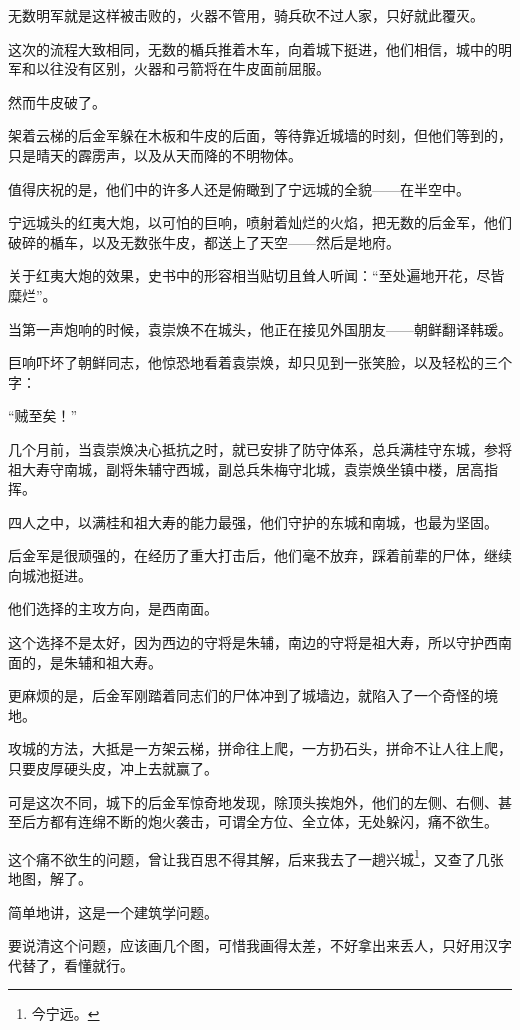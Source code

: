 \begin{multicols}{\theparacolNo}
		无数明军就是这样被击败的，火器不管用，骑兵砍不过人家，只好就此覆灭。

		这次的流程大致相同，无数的楯兵推着木车，向着城下挺进，他们相信，城中的明军和以往没有区别，火器和弓箭将在牛皮面前屈服。

		然而牛皮破了。

		架着云梯的后金军躲在木板和牛皮的后面，等待靠近城墙的时刻，但他们等到的，只是晴天的霹雳声，以及从天而降的不明物体。

		值得庆祝的是，他们中的许多人还是俯瞰到了宁远城的全貌——在半空中。

		宁远城头的红夷大炮，以可怕的巨响，喷射着灿烂的火焰，把无数的后金军，他们破碎的楯车，以及无数张牛皮，都送上了天空——然后是地府。

		关于红夷大炮的效果，史书中的形容相当贴切且耸人听闻：“至处遍地开花，尽皆糜烂”。

		当第一声炮响的时候，袁崇焕不在城头，他正在接见外国朋友——朝鲜翻译韩瑗。

		巨响吓坏了朝鲜同志，他惊恐地看着袁崇焕，却只见到一张笑脸，以及轻松的三个字：

		“贼至矣！”

		几个月前，当袁崇焕决心抵抗之时，就已安排了防守体系，总兵满桂守东城，参将祖大寿守南城，副将朱辅守西城，副总兵朱梅守北城，袁崇焕坐镇中楼，居高指挥。

		四人之中，以满桂和祖大寿的能力最强，他们守护的东城和南城，也最为坚固。

		后金军是很顽强的，在经历了重大打击后，他们毫不放弃，踩着前辈的尸体，继续向城池挺进。

		他们选择的主攻方向，是西南面。

		这个选择不是太好，因为西边的守将是朱辅，南边的守将是祖大寿，所以守护西南面的，是朱辅和祖大寿。

		更麻烦的是，后金军刚踏着同志们的尸体冲到了城墙边，就陷入了一个奇怪的境地。

		攻城的方法，大抵是一方架云梯，拼命往上爬，一方扔石头，拼命不让人往上爬，只要皮厚硬头皮，冲上去就赢了。

		可是这次不同，城下的后金军惊奇地发现，除顶头挨炮外，他们的左侧、右侧、甚至后方都有连绵不断的炮火袭击，可谓全方位、全立体，无处躲闪，痛不欲生。

		这个痛不欲生的问题，曾让我百思不得其解，后来我去了一趟兴城\footnote{今宁远。}，又查了几张地图，解了。

		简单地讲，这是一个建筑学问题。

		要说清这个问题，应该画几个图，可惜我画得太差，不好拿出来丢人，只好用汉字代替了，看懂就行。


\end{multicols}
